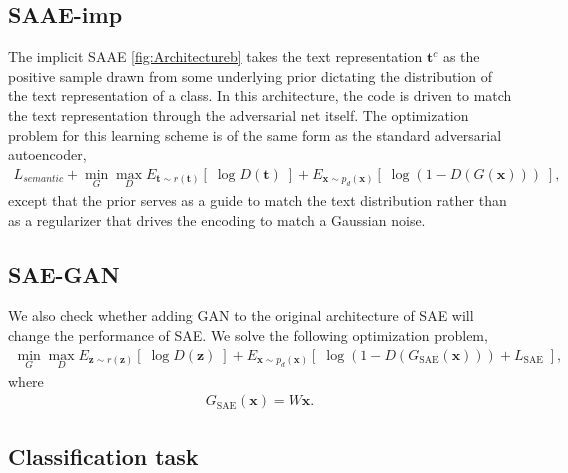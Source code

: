 \documentclass{article}
\newcommand{\bb}[1]{\boldsymbol{#1}}
\begin{document}



\subsection{SAAE-imp}
\label{subsec:TextPrior}
	
	The implicit SAAE \ref{fig:Architectureb} takes the text representation $\bb{t}^c$ as the positive sample drawn from some underlying prior dictating the distribution of the text representation of a class. In this architecture, the code is driven to match the text representation through the adversarial net itself. The optimization problem for this learning scheme is of the same form as the standard adversarial autoencoder,
	\begin{align}
   L_{semantic} + \min_{G} \max_D E_{\bb{t} \sim r(\bb{t})}\left[\; \log D(\bb{t}) \;\right] + E_{\bb{x} \sim p_d(\bb{x})}\left[\; \log( 1 - D(G(\bb{x})) ) \;\right],
	\end{align}
	except that the prior serves as a guide to match the text distribution rather than as a regularizer that drives the encoding to match a Gaussian noise.



\subsection{SAE-GAN}

	We also check whether adding GAN to the original architecture of SAE will change the performance of SAE. We solve the following optimization problem,
	\begin{align}
		\min_{G} \max_D E_{\bb{z} \sim r(\bb{z})}\left[\; \log D(\bb{z}) \;\right] + E_{\bb{x} \sim p_d(\bb{x})}\left[\; \log( 1 - D(G_{\textrm{SAE}}(\bb{x})) ) + L_{\textrm{SAE}} \;\right],
	\end{align}
	where
	\begin{align}
		G_{\textrm{SAE}}(\bb{x}) = W \bb{x}.
	\end{align}





\subsection{Classification task}
\end{document}
